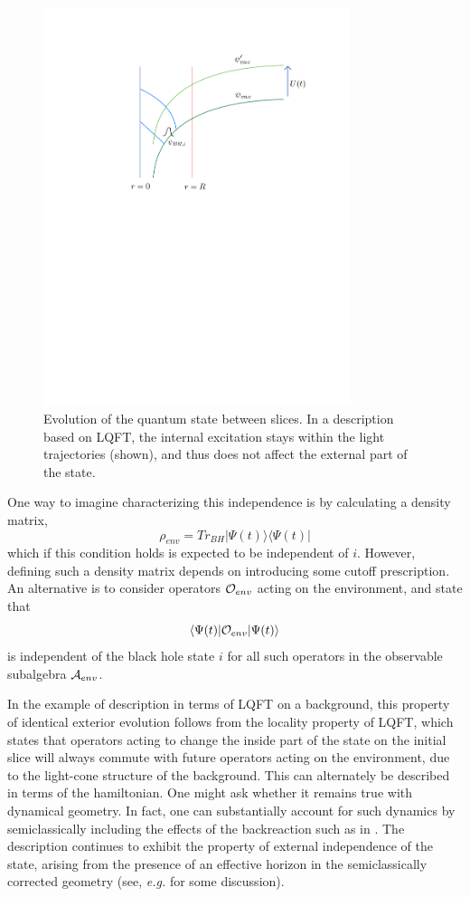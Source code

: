 \documentclass[11pt]{article}
\numberwithin{equation}{section}
\newcommand{\calo}{{\cal O}}
\newcommand{\cala}{{\cal A}}
\newcommand{\beq}{\begin{equation}}
\newcommand{\eeq}{\end{equation}}
\begin{document}
\begin{figure}[!hbtp] \begin{center}
\includegraphics[width=9cm]{Fig-slices.pdf}
\end{center}
\caption{Evolution of the quantum state between slices.  In a description based on LQFT, the internal excitation stays within the light trajectories (shown), and thus does not affect the external part of the state.}
\label{Figslices}
\end{figure} 


One way to imagine characterizing this independence is by calculating a density matrix,
\beq
\rho_{env} = Tr_{BH}|\Psi(t)\rangle\langle\Psi(t)|
\eeq
which if this condition holds is expected to be independent of $i$.  However, defining such a density matrix depends on introducing some cutoff prescription.  An alternative is to consider operators $\calo_{env}$ acting on the environment, and state that
\beq
\langle\Psi(t)|{\cal O}_{env}|\Psi(t)\rangle
\eeq
is independent of the black hole state $i$ for all such operators in the observable subalgebra $\cala_{env}$.  

In the example of description in terms of  LQFT on a background, this property of identical exterior evolution follows from the locality property of LQFT, which states that operators acting to change the inside part of the state on the initial slice will always commute with  future operators acting on the environment, due to the light-cone structure of the background.  This can alternately be described in terms of the hamiltonian.  One might ask whether it remains true with dynamical geometry.  In fact, one can substantially account for such dynamics by semiclassically including the effects of the backreaction such as in \cite{CGHS}.  The description continues to exhibit the property of external independence of the state, arising from the presence of an effective horizon in the semiclassically corrected geometry (see, {\it e.g.} \cite{GiNe} for some discussion).
\end{document}
